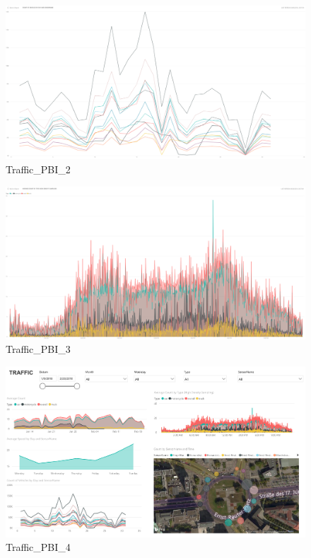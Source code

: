 \documentclass[11pt]{article}
\makeatletter
\def\maxwidth{\ifdim\Gin@nat@width>\linewidth\linewidth
    \else\Gin@nat@width\fi}
\let\Oldincludegraphics\includegraphics
\renewcommand{\includegraphics}[1]{\Oldincludegraphics[width=.8\maxwidth]{#1}}
\makeatother
\begin{document}
    \begin{figure}
\centering
\includegraphics{images/_powerBI_slides/averageCountCarSensorCalendar.PNG}
\caption{Traffic\_PBI\_2}
\end{figure}

    \begin{figure}
\centering
\includegraphics{images/_powerBI_slides/highDensityCarType.PNG}
\caption{Traffic\_PBI\_3}
\end{figure}

    \begin{figure}
\centering
\includegraphics{images/_powerBI_slides/04_traffic.PNG}
\caption{Traffic\_PBI\_4}
\end{figure}
\end{document}
